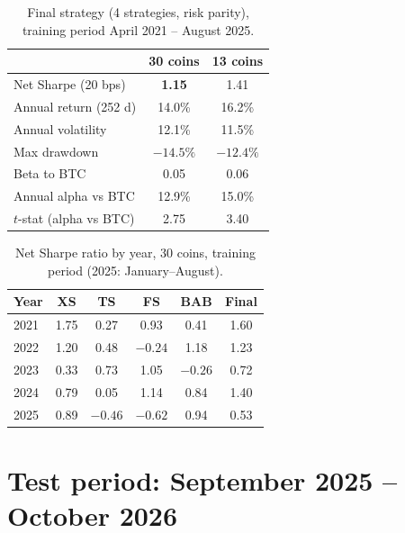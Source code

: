 \documentclass[aps,prl,onecolumn,superscriptaddress,nofootinbib]{revtex4-2}
\begin{document}
	\begin{table}[!htbp]
		\caption{Final strategy (4 strategies, risk parity), training period April 2021 -- August 2025.}
		\label{tab:final}
		\begin{ruledtabular}
			\begin{tabular}{lcc}
				& 30 coins & 13 coins \\
				\hline
				Net Sharpe (20 bps)        & \textbf{1.15} & 1.41 \\
				Annual return (252 d)      & 14.0\% & 16.2\% \\
				Annual volatility          & 12.1\% & 11.5\% \\
				Max drawdown               & $-14.5\%$ & $-12.4\%$ \\
				Beta to BTC                & 0.05 & 0.06 \\
				Annual alpha vs BTC        & 12.9\% & 15.0\% \\
				$t$-stat (alpha vs BTC)    & 2.75 & 3.40 \\
			\end{tabular}
		\end{ruledtabular}
	\end{table}

	\begin{table}[!htbp]
		\caption{Net Sharpe ratio by year, 30 coins, training period (2025: January--August).}
		\label{tab:yearly}
		\begin{ruledtabular}
			\begin{tabular}{lccccc}
				Year & XS & TS & FS & BAB & Final \\
				\hline
				2021 & 1.75 & 0.27    & 0.93    & 0.41    & 1.60 \\
				2022 & 1.20 & 0.48    & $-0.24$ & 1.18    & 1.23 \\
				2023 & 0.33 & 0.73    & 1.05    & $-0.26$ & 0.72 \\
				2024 & 0.79 & 0.05    & 1.14    & 0.84    & 1.40 \\
				2025 & 0.89 & $-0.46$ & $-0.62$ & 0.94    & 0.53 \\
			\end{tabular}
		\end{ruledtabular}
	\end{table}

	\section{Test period: September 2025 -- October 2026}
	\label{sec:test}
\end{document}
